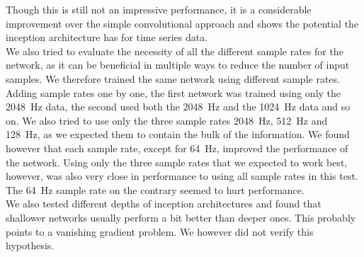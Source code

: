 Though this is still not an impressive performance, it is a considerable improvement over the simple convolutional approach and shows the potential the inception architecture has for time series data.\medskip\\
We also tried to evaluate the necessity of all the different sample rates for the network, as it can be beneficial in multiple ways to reduce the number of input samples. We therefore trained the same network using different sample rates. Adding sample rates one by one, the first network was trained using only the \SI{2048}{\hertz} data, the second used both the \SI{2048}{\hertz} and the \SI{1024}{\hertz} data and so on. We also tried to use only the three sample rates \SI{2048}{\hertz}, \SI{512}{\hertz} and \SI{128}{\hertz}, as we expected them to contain the bulk of the information. We found however that each sample rate, except for \SI{64}{\hertz}, improved the performance of the network. Using only the three sample rates that we expected to work best, however, was also very close in performance to using all sample rates in this test. The \SI{64}{\hertz} sample rate on the contrary seemed to hurt performance.\\
We also tested different depths of inception architectures and found that shallower networks usually perform a bit better than deeper ones. This probably points to a vanishing gradient problem. We however did not verify this hypothesis.
